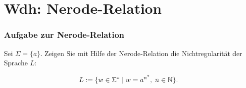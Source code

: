 \newcommand{\thetm}{\begin{tikzpicture}[node distance=2.5cm,auto]
  \node(q0)[state,initial]{$q_0$};
  \node(q1)[state,right of=q0]{$q_1$};
  \node(q2)[state,right of=q1]{$q_2$};
  \node(q3)[state,right of=q2]{$q_3$};
  \node(q4)[state,above of=q3]{$q_4$};
  \node(q5)[state,accepting,below of=q0]{$q_4$};
  \path[->]       (q0) edge node{$a|\sqcup,R$} (q1)
	          (q0) edge node{$\sqcup|\sqcup,N$} (q5)
	          (q1) edge[loop above] node{$a|a,R$} ()
	          (q1) edge node{$b|b,R$} (q2)
	          (q1) edge node{$\sqcup|\sqcup,N$} (q5)
	          (q2) edge[loop below] node{$b|b,R$} ()
	          (q2) edge node{$\sqcup|\sqcup,L$} (q3)
	          (q3) edge node{$b|\sqcup,L$} (q4)
	          (q4) edge[loop above] node{$a|a,L; b|b,L$} ()
	          (q4) edge[bend right] node{$\sqcup|\sqcup,R$} (q0);
 \end{tikzpicture}}



\section{Wdh: Nerode-Relation}
\begin{frame}
	\frametitle{Aufgabe zur Nerode-Relation}
	
	Sei $\Sigma = \{a\}$.
Zeigen Sie mit Hilfe der Nerode-Relation die Nichtregularit\"at der Sprache $L$: 

\[L := \{w \in \Sigma^*\mid w = a^{n^2},\; n \in \mathbb{N}\}.\]
\end{frame}

